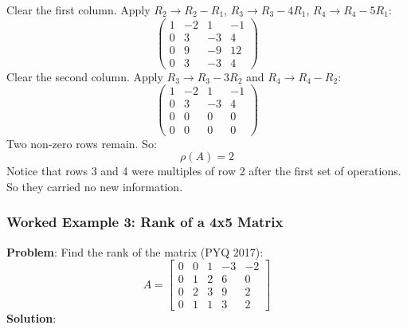 \documentclass[
]{article}
\begin{document}
Clear the first column. Apply \(R_2 \to R_2 - R_1\),
\(R_3 \to R_3 - 4R_1\), \(R_4 \to R_4 - 5R_1\):
\[
\begin{pmatrix}
1 & -2 & 1 & -1 \\
0 & 3 & -3 & 4 \\
0 & 9 & -9 & 12 \\
0 & 3 & -3 & 4
\end{pmatrix}
\]
Clear the second column. Apply \(R_3 \to R_3 - 3R_2\) and
\(R_4 \to R_4 - R_2\):
\[
\begin{pmatrix}
1 & -2 & 1 & -1 \\
0 & 3 & -3 & 4 \\
0 & 0 & 0 & 0 \\
0 & 0 & 0 & 0
\end{pmatrix}
\]
Two non-zero rows remain. So:
\[
\rho(A) = 2
\]
Notice that rows 3 and 4 were multiples of row 2 after the first set of
operations. So they carried no new information.

\subsubsection{Worked Example 3: Rank of a 4x5
Matrix}\label{worked-example-3-rank-of-a-4x5-matrix}

\textbf{Problem}: Find the rank of the matrix (PYQ 2017):
\[
A =
\begin{bmatrix}
0 & 0 & 1 & -3 & -2 \\
0 & 1 & 2 & 6 & 0 \\
0 & 2 & 3 & 9 & 2 \\
0 & 1 & 1 & 3 & 2
\end{bmatrix}
\]
\textbf{Solution}:
\end{document}
